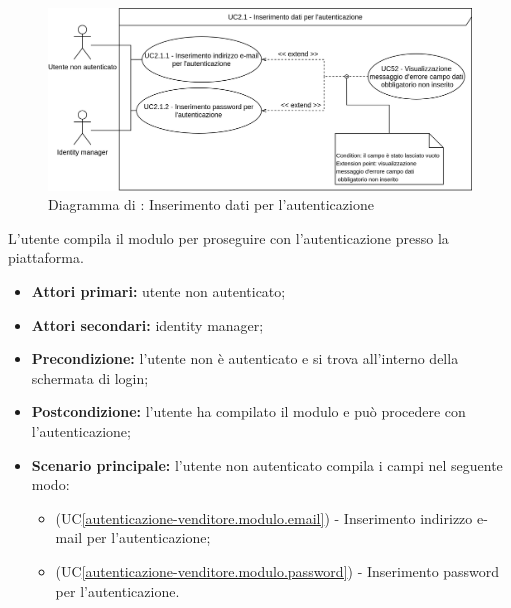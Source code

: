 \begin{figure}[H]
	\centering
	\includegraphics[scale=0.8]{Immagini/DiagrammiUC/AccessoAllaPiattaforma/InserimentoDatiAutenticazione.png}
	\caption{Diagramma di \actualSubUC: Inserimento dati per l'autenticazione}
	\label{fig:autenticazione-venditore.modulo}
\end{figure}

L'utente compila il modulo per proseguire con l'autenticazione presso la piattaforma.
\begin{itemize}
	\item \textbf{Attori primari:} utente non autenticato;
	\item \textbf{Attori secondari:} identity manager;
	\item \textbf{Precondizione:} l'utente non è autenticato e si trova all'interno della schermata di login;
	\item \textbf{Postcondizione:} l'utente ha compilato il modulo e può procedere con l'autenticazione;
	\item \textbf{Scenario principale:} l'utente non autenticato compila i campi nel seguente modo:
	\begin{itemize}
		\item (UC\ref{autenticazione-venditore.modulo.email}) - Inserimento indirizzo e-mail per l'autenticazione;
		\item (UC\ref{autenticazione-venditore.modulo.password}) - Inserimento password per l'autenticazione.
	\end{itemize}
\end{itemize}

\label{autenticazione-venditore.modulo.email}

